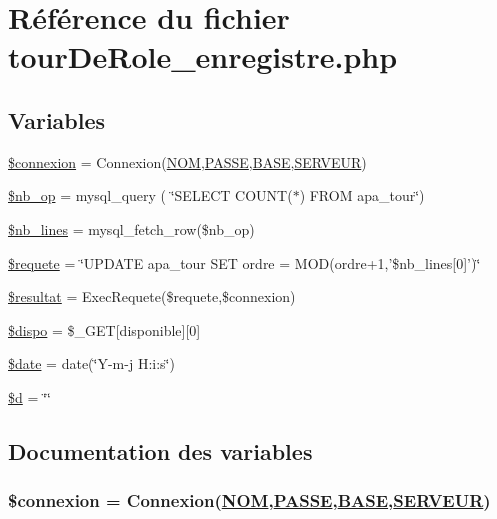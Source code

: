 \hypertarget{tourDeRole__enregistre_8php}{
\section{R\'{e}f\'{e}rence du fichier tour\-De\-Role\_\-enregistre.php}
\label{tourDeRole__enregistre_8php}
}
\subsection*{Variables}
\begin{CompactItemize}
\item 
\hyperlink{tourDeRole__enregistre_8php_a0}{\$connexion} = Connexion(\hyperlink{pma__connect_8php_a0}{NOM},\hyperlink{pma__connect_8php_a1}{PASSE},\hyperlink{pma__connect_8php_a3}{BASE},\hyperlink{pma__connect_8php_a2}{SERVEUR})
\item 
\hyperlink{tourDeRole__enregistre_8php_a1}{\$nb\_\-op} = mysql\_\-query ( \char`\"{}SELECT COUNT($\ast$) FROM apa\_\-tour\char`\"{})
\item 
\hyperlink{tourDeRole__enregistre_8php_a2}{\$nb\_\-lines} = mysql\_\-fetch\_\-row(\$nb\_\-op)
\item 
\hyperlink{tourDeRole__enregistre_8php_a3}{\$requete} = \char`\"{}UPDATE apa\_\-tour SET ordre = MOD(ordre+1,'\$nb\_\-lines\mbox{[}0\mbox{]}')\char`\"{}
\item 
\hyperlink{tourDeRole__enregistre_8php_a4}{\$resultat} = Exec\-Requete(\$requete,\$connexion)
\item 
\hyperlink{tourDeRole__enregistre_8php_a5}{\$dispo} = \$\_\-GET\mbox{[}disponible\mbox{]}\mbox{[}0\mbox{]}
\item 
\hyperlink{tourDeRole__enregistre_8php_a6}{\$date} = date(\char`\"{}Y-m-j H:i:s\char`\"{})
\item 
\hyperlink{tourDeRole__enregistre_8php_a7}{\$d} = \char`\"{}\char`\"{}
\end{CompactItemize}


\subsection{Documentation des variables}
\hypertarget{tourDeRole__enregistre_8php_a0}{
\subsubsection[\$connexion]{\setlength{\rightskip}{0pt plus 5cm}\$connexion = Connexion(\hyperlink{pma__connect_8php_a0}{NOM},\hyperlink{pma__connect_8php_a1}{PASSE},\hyperlink{pma__connect_8php_a3}{BASE},\hyperlink{pma__connect_8php_a2}{SERVEUR})}}
\label{tourDeRole__enregistre_8php_a0}


